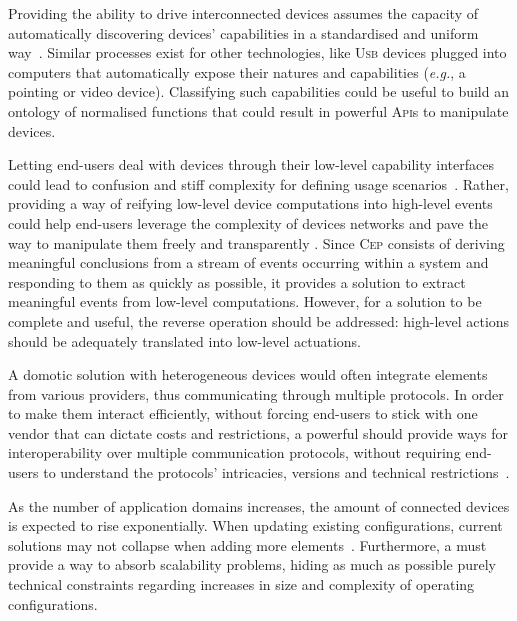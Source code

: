 \begin{description}[leftmargin=0cm]
	\item[Capability Discovery] Providing the ability to drive interconnected devices assumes the capacity of automatically discovering devices' capabilities in a standardised and uniform way~\cite{chaqfeh-12}. Similar processes exist for other technologies, like \textsc{Usb} devices plugged into computers that automatically expose their natures and capabilities (\textit{e.g.}, a pointing or video device). Classifying such capabilities could be useful to build an ontology of normalised functions that could result in powerful \textsc{Api}s to manipulate devices. 
		
	\item[Complex Event Processing (\textsc{Cep})] Letting end-users deal with devices through their low-level capability interfaces could lead to confusion and stiff complexity for defining usage scenarios~\cite{ma-13}. Rather, providing a way of reifying low-level device computations into high-level events could help end-users leverage the complexity of devices networks and pave the way to manipulate them freely and transparently \cite{J:Cugola-Margara:2012}. Since \textsc{Cep} consists of deriving meaningful conclusions from a stream of events occurring within a system and responding to them as quickly as possible, it provides a solution to extract meaningful events from low-level computations. However, for a solution to be complete and useful, the reverse operation should be addressed: high-level actions should be adequately translated into low-level actuations. 
		
	\item[Protocol Interoperability] A domotic solution with heterogeneous devices would often integrate elements from various providers, thus communicating through multiple protocols. In order to make them interact efficiently, without forcing end-users to stick with one vendor that can dictate costs and restrictions, a powerful \DSL should provide ways for interoperability over multiple communication protocols, without requiring end-users to understand the protocols' intricacies, versions and technical restrictions~\cite{gubbi-13}.
	
	\item[Scalability] As the number of application domains increases, the amount of connected devices is expected to rise exponentially. When updating existing \IOT configurations, current solutions may not collapse when adding more elements~\cite{mukho-14}. Furthermore, a \DSL must provide a way to absorb scalability problems, hiding as much as possible purely technical constraints regarding increases in size and complexity of operating configurations. 
	

\end{description}

